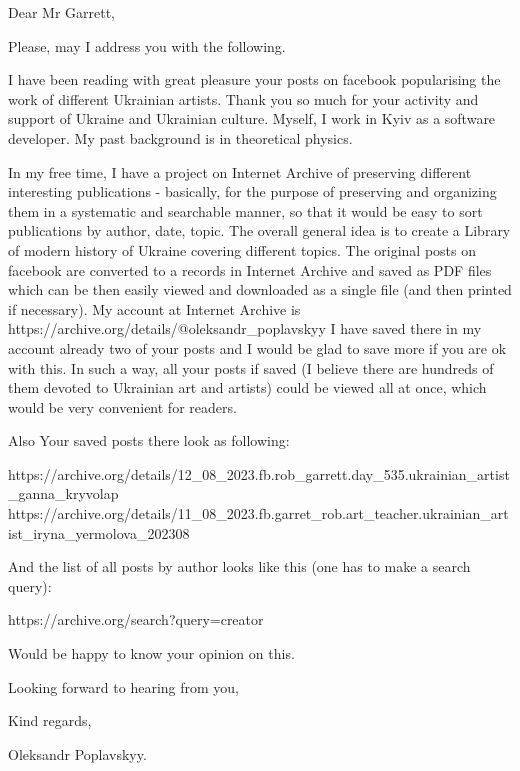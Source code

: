  
 
 
 
 

Dear Mr Garrett,

Please, may I address you with the following.

I have been reading with great pleasure your posts on facebook
popularising the work of different Ukrainian artists. Thank you
so much for your activity and support of Ukraine and Ukrainian culture.
Myself, I work in Kyiv as a software developer. My past background is in theoretical
physics.

In my free time, I have a project on Internet Archive of preserving
different interesting publications - basically, for the purpose of preserving
and organizing them in a systematic and searchable manner, so that it would be 
easy to sort publications by author, date, topic. The overall general idea is to create a Library of modern history of Ukraine
covering different topics. The original posts on facebook
are converted to a records in Internet Archive and saved as PDF files
which can be then easily viewed and downloaded as a single file (and then printed if necessary).
My account at Internet Archive is 
https://archive.org/details/@oleksandr_poplavskyy
I have saved there in my account already two of your posts and I would be glad to save
more if you are ok with this. In such a way, 
all your posts if saved (I believe there are hundreds of them devoted to Ukrainian art and artists) could be viewed all at once,
which would be very convenient for readers.

Also Your saved posts there look as following:

https://archive.org/details/12_08_2023.fb.rob_garrett.day_535.ukrainian_artist_ganna_kryvolap
https://archive.org/details/11_08_2023.fb.garret_rob.art_teacher.ukrainian_artist_iryna_yermolova_202308

And the list of all posts by author looks like this (one has to make a search query):

https://archive.org/search?query=creator%

Would be happy to know your opinion on this.

Looking forward to hearing from you,

Kind regards,

Oleksandr Poplavskyy.
